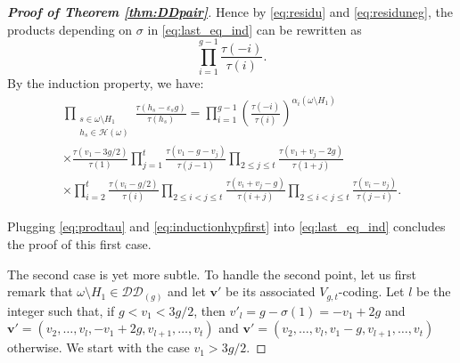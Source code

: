 \documentclass[11pt,letterpaper]{amsart}
\def\cch{\mathcal H}
\def\ccdd{\mathcal {DD}}
\numberwithin{equation}{section}
\numberwithin{df}{section}
\begin{document}
\begin{proof}[\textbf{Proof of Theorem \ref{thm:DDpair}}]
Hence by \eqref{eq:residu} and \eqref{eq:residuneg}, the products depending on $\sigma$ in \eqref{eq:last_eq_ind} can be rewritten as
\begin{equation}\label{eq:prodtau}
\prod_{i=1}^{g-1}\frac{\tau(-i)}{\tau(i)}.
\end{equation}
By the induction property, we have:
\begin{multline}\label{eq:inductionhypfirst}
\prod_{\substack{s\in\omega\setminus H_1\\h_s\in\cch(\omega)}}\frac{\tau(h_s-\varepsilon_s g)}{\tau(h_s)}= \prod_{i=1}^{g-1}\left(\frac{\tau(-i)}{\tau(i)}\right)^{\alpha_i(\omega\setminus H_1)}\\
\times\frac{\tau(v_1-3g/2)}{\tau(1)} \prod_{j=1}^{t} \frac{\tau(v_1-g-v_j)}{\tau(j-1)}
\prod_{2\leq j\leq t}\frac{\tau(v_1+v_j-2g)}{\tau(1+j)}
\\
\times\prod_{i=2}^{t}
\frac{\tau(v_i-g/2)}{\tau(i)}\prod_{2\leq i<j\leq t}  \frac{\tau(v_i+v_j-g)}{\tau(i+j)} \prod_{2\leq i<j\leq t} \frac{\tau(v_i-v_j)}{\tau(j-i)}.
\end{multline}

Plugging \eqref{eq:prodtau} and \eqref{eq:inductionhypfirst} into \eqref{eq:last_eq_ind} concludes the proof of this first case.


\noindent 
The second case is yet more subtle. To handle the second point, let us first remark that $\omega\setminus H_1\in \ccdd_{(g)}$ and let $\mathbf{v'}$ be its associated $V_{g,t}$-coding.
 Let $l$ be the integer such that, if $g<v_1<3g/2$, then $v'_l=g-\sigma(1)=-v_1+2g$ and $\mathbf{v'}=(v_2,\dots,v_l,-v_1+2g,v_{l+1},\dots,v_{t})$ and $\mathbf{v'}=(v_2,\dots,v_l,v_1-g,v_{l+1},\dots,v_{t})$ otherwise.
We start with the case $v_1>3g/2$. 
 

\end{proof}
\end{document}

